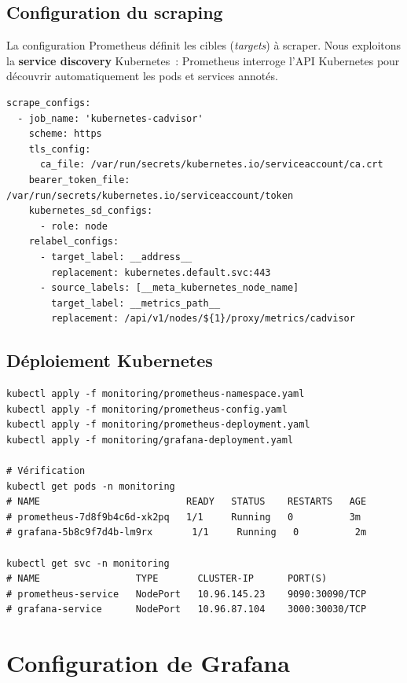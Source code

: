 \documentclass[12pt,a4paper,french]{report}
\newcommand{\kw}[1]{\textbf{#1}}
\begin{document}
\subsection{Configuration du scraping}

La configuration Prometheus définit les cibles (\emph{targets}) à scraper. Nous exploitons la \kw{service discovery} Kubernetes~: Prometheus interroge l'API Kubernetes pour découvrir automatiquement les pods et services annotés.

\begin{lstlisting}[style=yaml, caption={Configuration Prometheus – scraping des nœuds et cAdvisor}]
scrape_configs:
  - job_name: 'kubernetes-cadvisor'
    scheme: https
    tls_config:
      ca_file: /var/run/secrets/kubernetes.io/serviceaccount/ca.crt
    bearer_token_file: /var/run/secrets/kubernetes.io/serviceaccount/token
    kubernetes_sd_configs:
      - role: node
    relabel_configs:
      - target_label: __address__
        replacement: kubernetes.default.svc:443
      - source_labels: [__meta_kubernetes_node_name]
        target_label: __metrics_path__
        replacement: /api/v1/nodes/${1}/proxy/metrics/cadvisor
\end{lstlisting}

\subsection{Déploiement Kubernetes}

\begin{lstlisting}[style=bash, caption={Déploiement de la pile de monitoring}]
kubectl apply -f monitoring/prometheus-namespace.yaml
kubectl apply -f monitoring/prometheus-config.yaml
kubectl apply -f monitoring/prometheus-deployment.yaml
kubectl apply -f monitoring/grafana-deployment.yaml

# Vérification
kubectl get pods -n monitoring
# NAME                          READY   STATUS    RESTARTS   AGE
# prometheus-7d8f9b4c6d-xk2pq   1/1     Running   0          3m
# grafana-5b8c9f7d4b-lm9rx       1/1     Running   0          2m

kubectl get svc -n monitoring
# NAME                 TYPE       CLUSTER-IP      PORT(S)
# prometheus-service   NodePort   10.96.145.23    9090:30090/TCP
# grafana-service      NodePort   10.96.87.104    3000:30030/TCP
\end{lstlisting}

\section{Configuration de Grafana}
\end{document}
